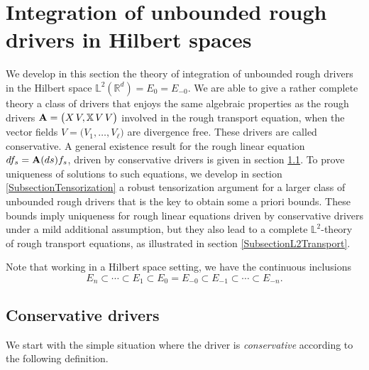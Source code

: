 \documentclass[11pt,a4paper]{amsart}
\newcommand{\RR}{\mathbb{R}}  \newcommand{\CC}{\mathbb{C}}  \newcommand{\LL}{\mathbb{L}}  \newcommand{\WW}{\mathbb{W}}
\newcommand{\bbX}{\mathbb{X}}
\newcommand{\ssk}{\smallskip}
\numberwithin{equation}{section} %
\begin{document}
\medskip


\section{Integration of unbounded rough drivers in Hilbert spaces}
\label{SectionHilbertSpaceTheory}

We develop in this section the theory of integration of unbounded rough drivers in the Hilbert space $\LL^2(\RR^d)=E_0=E_{-0}$. We are able to give a rather complete theory a class of drivers that enjoys the same algebraic properties as the rough drivers ${\bfA} = \big(X\,V,\bbX\,V\,V\big)$ involved in the rough transport equation, when the vector fields $V=\big(V_1,\dots,V_\ell\big)$ are divergence free. These drivers are called conservative. A general existence result for the rough linear equation $df_s = {\bf A}(ds)f_s$, driven by conservative drivers is given in section \ref{SubsectionIntegrationConservative}. To prove uniqueness of solutions to such equations, we develop in section \eqref{SubsectionTensorization} a robust tensorization argument for a larger class of unbounded rough drivers that is the key to obtain some a priori bounds. These bounds imply uniqueness for rough linear equations driven by conservative drivers under a mild additional assumption, but they also lead to a complete $\LL^2$-theory of rough transport equations, as illustrated in section \eqref{SubsectionL2Transport}.

\ssk

Note that working in a Hilbert space setting, we have the continuous inclusions
\begin{equation}
\label{EqDoubleInclusion}
E_n\subset \cdots \subset E_1\subset E_0 = E_{-0}\subset E_{-1}\subset \cdots\subset E_{-n}.
\end{equation}

\medskip

\subsection{Conservative drivers}
\label{SubsectionIntegrationConservative}

We start with the simple situation where the driver is \emph{conservative} according to the following definition.
\end{document}
